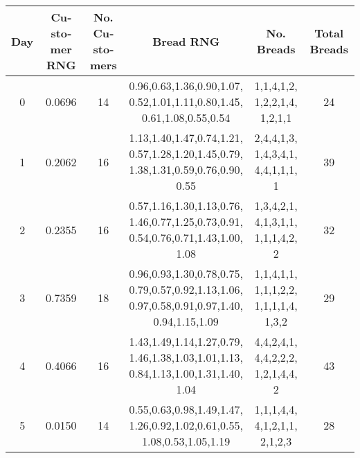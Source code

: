 \begin{latin}\centering\begin{tabular}{|c|c|c|c|c|c|}
    \hline
    Day & Customer RNG & No. Customers & Bread RNG & No. Breads & Total Breads \\
    \hline
    0 & 0.0696 & 14 & \makecell{0.96,0.63,1.36,0.90,1.07,\\0.52,1.01,1.11,0.80,1.45,\\0.61,1.08,0.55,0.54} & \makecell{1,1,4,1,2,\\1,2,2,1,4,\\1,2,1,1} & 24 \\
    \hline
    1 & 0.2062 & 16 & \makecell{1.13,1.40,1.47,0.74,1.21,\\0.57,1.28,1.20,1.45,0.79,\\1.38,1.31,0.59,0.76,0.90,\\0.55} & \makecell{2,4,4,1,3,\\1,4,3,4,1,\\4,4,1,1,1,\\1} & 39 \\       
    \hline
    2 & 0.2355 & 16 & \makecell{0.57,1.16,1.30,1.13,0.76,\\1.46,0.77,1.25,0.73,0.91,\\0.54,0.76,0.71,1.43,1.00,\\1.08} & \makecell{1,3,4,2,1,\\4,1,3,1,1,\\1,1,1,4,2,\\2} & 32 \\       
    \hline
    3 & 0.7359 & 18 & \makecell{0.96,0.93,1.30,0.78,0.75,\\0.79,0.57,0.92,1.13,1.06,\\0.97,0.58,0.91,0.97,1.40,\\0.94,1.15,1.09} & \makecell{1,1,4,1,1,\\1,1,1,2,2,\\1,1,1,1,4,\\1,3,2} 
    & 29 \\
    \hline
    4 & 0.4066 & 16 & \makecell{1.43,1.49,1.14,1.27,0.79,\\1.46,1.38,1.03,1.01,1.13,\\0.84,1.13,1.00,1.31,1.40,\\1.04} & \makecell{4,4,2,4,1,\\4,4,2,2,2,\\1,2,1,4,4,\\2} & 43 \\       
    \hline
    5 & 0.0150 & 14 & \makecell{0.55,0.63,0.98,1.49,1.47,\\1.26,0.92,1.02,0.61,0.55,\\1.08,0.53,1.05,1.19} & \makecell{1,1,1,4,4,\\4,1,2,1,1,\\2,1,2,3} & 28 \\

\end{tabular}
\end{latin}

